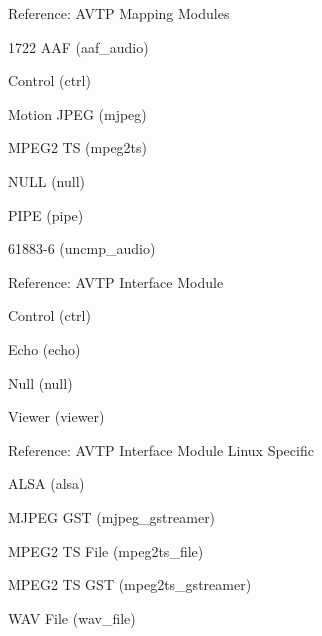 \begin{DoxyItemize}
\item Reference\+: A\+V\+TP Mapping Modules
\begin{DoxyItemize}
\item 1722 A\+AF (aaf\+\_\+audio)
\item Control (ctrl)
\item Motion J\+P\+EG (mjpeg)
\item M\+P\+E\+G2 TS (mpeg2ts)
\item N\+U\+LL (null)
\item P\+I\+PE (pipe)
\item 61883-\/6 (uncmp\+\_\+audio)
\end{DoxyItemize}
\item Reference\+: A\+V\+TP Interface Module
\begin{DoxyItemize}
\item Control (ctrl)
\item Echo (echo)
\item Null (null)
\item Viewer (viewer)
\end{DoxyItemize}
\item Reference\+: A\+V\+TP Interface Module Linux Specific
\begin{DoxyItemize}
\item A\+L\+SA (alsa)
\item M\+J\+P\+EG G\+ST (mjpeg\+\_\+gstreamer)
\item M\+P\+E\+G2 TS File (mpeg2ts\+\_\+file)
\item M\+P\+E\+G2 TS G\+ST (mpeg2ts\+\_\+gstreamer)
\item W\+AV File (wav\+\_\+file) 
\end{DoxyItemize}
\end{DoxyItemize}